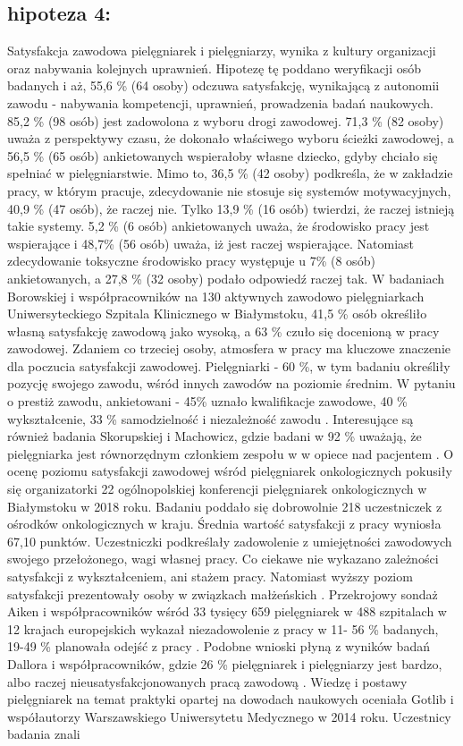 \documentclass[a4paper,12pt,twoside,openany]{report}
\begin{document}
\subsection{hipoteza 4:} 
Satysfakcja zawodowa pielęgniarek i pielęgniarzy, wynika z kultury organizacji oraz nabywania kolejnych uprawnień. Hipotezę tę poddano weryfikacji osób badanych i aż, 55,6 \%  (64 osoby) odczuwa satysfakcję, wynikającą z autonomii zawodu - nabywania kompetencji, uprawnień, prowadzenia badań naukowych.   85,2 \% (98 osób) jest zadowolona z wyboru drogi zawodowej. 71,3 \% (82 osoby) uważa z perspektywy czasu, że dokonało właściwego wyboru ścieżki zawodowej, a 56,5 \% (65 osób) ankietowanych wspierałoby własne dziecko, gdyby chciało się spełniać w pielęgniarstwie. Mimo to,  36,5 \% (42 osoby) podkreśla, że w zakładzie pracy, w którym pracuje,   zdecydowanie nie stosuje się systemów motywacyjnych, 40,9 \% (47 osób), że raczej nie. Tylko 13,9 \% (16 osób) twierdzi, że raczej istnieją takie systemy. 5,2 \% (6 osób) ankietowanych uważa, że środowisko pracy jest wspierające i 48,7\%  (56 osób)  uważa, iż jest raczej wspierające. Natomiast zdecydowanie toksyczne środowisko pracy występuje u 7\% (8 osób) ankietowanych, a 27,8 \%  (32 osoby) podało odpowiedź raczej tak. W badaniach  Borowskiej i współpracowników na 130 aktywnych zawodowo pielęgniarkach Uniwersyteckiego Szpitala Klinicznego w Białymstoku, 41,5 \% osób określiło własną satysfakcję zawodową jako wysoką, a 63 \% czuło się docenioną w pracy zawodowej. Zdaniem co trzeciej osoby, atmosfera w pracy ma kluczowe znaczenie dla poczucia satysfakcji zawodowej. Pielęgniarki - 60 \%, w tym badaniu określiły  pozycję swojego zawodu, wśród innych zawodów na poziomie średnim. W pytaniu o prestiż zawodu, ankietowani - 45\% uznało kwalifikacje zawodowe, 40 \% wykształcenie, 33 \% samodzielność i niezależność zawodu \cite{zbiorowa}. Interesujące są również badania Skorupskiej  i Machowicz, gdzie badani w 92 \% uważają, że pielęgniarka jest równorzędnym członkiem zespołu w w opiece nad pacjentem \cite{skorupska}. O ocenę poziomu satysfakcji zawodowej wśród pielęgniarek onkologicznych pokusiły się organizatorki 22 ogólnopolskiej konferencji pielęgniarek onkologicznych w Białymstoku w 2018 roku. Badaniu poddało się dobrowolnie 218 uczestniczek z ośrodków onkologicznych w kraju. Średnia wartość satysfakcji z pracy wyniosła 67,10 punktów. Uczestniczki podkreślały zadowolenie z umiejętności zawodowych swojego przełożonego, wagi własnej pracy. Co ciekawe nie wykazano zależności satysfakcji z wykształceniem, ani stażem pracy. Natomiast wyższy poziom satysfakcji prezentowały osoby w związkach małżeńskich \cite{onkologiczne}. Przekrojowy sondaż Aiken i współpracowników wśród  33 tysięcy 659 pielęgniarek w 488 szpitalach w 12 krajach europejskich wykazał niezadowolenie z pracy  w 11- 56 \% badanych, 19-49 \% planowała odejść z pracy \cite{termedia}. Podobne wnioski płyną z wyników badań Dallora  i współpracowników, gdzie 26 \% pielęgniarek i pielęgniarzy jest bardzo, albo raczej nieusatysfakcjonowanych pracą zawodową \cite{dalora}. Wiedzę i postawy pielęgniarek na temat praktyki opartej na dowodach naukowych oceniała Gotlib i współautorzy Warszawskiego Uniwersytetu Medycznego w 2014 roku. Uczestnicy badania znali 
\end{document}
